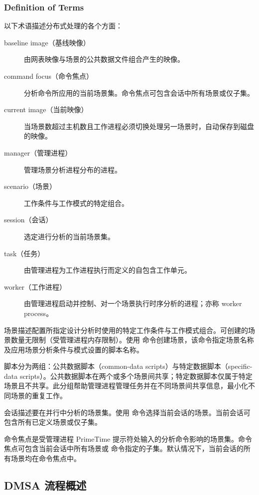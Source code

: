 \subsubsection*{Definition of Terms}

以下术语描述分布式处理的各个方面：
\begin{description}
  \item[baseline image（基线映像）] 由网表映像与场景的公共数据文件组合产生的映像。
  \item[command focus（命令焦点）] 分析命令所应用的当前场景集。命令焦点可包含会话中所有场景或仅子集。
  \item[current image（当前映像）] 当场景数超过主机数且工作进程必须切换处理另一场景时，自动保存到磁盘的映像。
  \item[manager（管理进程）] 管理场景分析进程分布的进程。
  \item[scenario（场景）] 工作条件与工作模式的特定组合。
  \item[session（会话）] 选定进行分析的当前场景集。
  \item[task（任务）] 由管理进程为工作进程执行而定义的自包含工作单元。
  \item[worker（工作进程）] 由管理进程启动并控制、对一个场景执行时序分析的进程；亦称 worker process。
\end{description}


场景描述配置所指定设计分析时使用的特定工作条件与工作模式组合。可创建的场景数量无限制（受管理进程内存限制）。使用  命令创建场景，该命令指定场景名称及应用场景分析条件与模式设置的脚本名称。

脚本分为两组：公共数据脚本（common-data scripts）与特定数据脚本（specific-data scripts）。公共数据脚本在两个或多个场景间共享；特定数据脚本仅属于特定场景且不共享。此分组帮助管理进程管理任务并在不同场景间共享信息，最小化不同场景的重复工作。

会话描述要在并行中分析的场景集。使用  命令选择当前会话的场景。当前会话可包含所有已定义场景或仅子集。

命令焦点是受管理进程 PrimeTime 提示符处输入的分析命令影响的场景集。命令焦点可包含当前会话中所有场景或  命令指定的子集。默认情况下，当前会话的所有场景均在命令焦点中。

\subsection{DMSA 流程概述}
